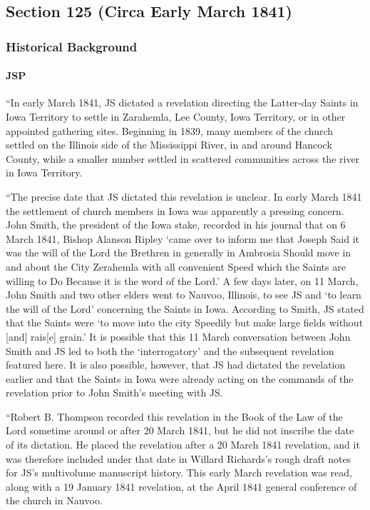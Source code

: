 \subsection{Section 125 (Circa Early March 1841)}
	\label{DC125}
	
	\subsubsection{Historical Background}
		\label{DC125-HB}
		
		\paragraph{JSP}
		
			``In early March 1841, JS dictated a revelation directing the Latter-day Saints in Iowa Territory to settle in Zarahemla, Lee County, Iowa Territory, or in other appointed gathering sites. Beginning in 1839, many members of the church settled on the Illinois side of the Mississippi River, in and around Hancock County, while a smaller number settled in scattered communities across the river in Iowa Territory.
			
			``The precise date that JS dictated this revelation is unclear. In early March 1841 the settlement of church members in Iowa was apparently a pressing concern. John Smith, the president of the Iowa stake, recorded in his journal that on 6 March 1841, Bishop Alanson Ripley `came over to inform me that Joseph Said it was the will of the Lord the Brethren in generally in Ambrosia Should move in and about the City Zerahemla with all convenient Speed which the Saints are willing to Do Because it is the word of the Lord.' A few days later, on 11 March, John Smith and two other elders went to Nauvoo, Illinois, to see JS and `to learn the will of the Lord' concerning the Saints in Iowa. According to Smith, JS stated that the Saints were `to move into the city Speedily but make large fields without [and] rais[e] grain.' It is possible that this 11 March conversation between John Smith and JS led to both the `interrogatory' and the subsequent revelation featured here. It is also possible, however, that JS had dictated the revelation earlier and that the Saints in Iowa were already acting on the commands of the revelation prior to John Smith's meeting with JS.
			
			``Robert B. Thompson recorded this revelation in the Book of the Law of the Lord sometime around or after 20 March 1841, but he did not inscribe the date of its dictation. He placed the revelation after a 20 March 1841 revelation, and it was therefore included under that date in Willard Richards's rough draft notes for JS's multivolume manuscript history. This early March revelation was read, along with a 19 January 1841 revelation, at the April 1841 general conference of the church in Nauvoo.
			
